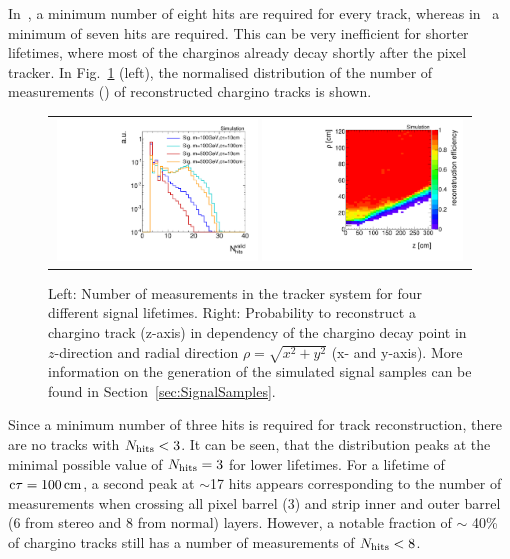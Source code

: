 In~\cite{bib:CMS:HSCP_8TeV}, a minimum number of eight hits are required for every track, whereas in~\cite{bib:CMS:DT_8TeV} a minimum of seven hits are required.
This can be very inefficient for shorter lifetimes, where most of the charginos already decay shortly after the pixel tracker.
In Fig.~\ref{fig:NHits_2Signal_noSelection_normalized} (left), the normalised distribution of the number of measurements (\nhits) of reconstructed chargino tracks is shown. 
\begin{figure}[!b]
  \centering 
  \begin{tabular}{c}
  \includegraphics[width=0.49\textwidth]{figures/analysis_2/MotivationAndGeneralSearchStrategy/htrackNValid_log_chiTracksnoSelection.pdf}
  \includegraphics[width=0.49\textwidth]{figures/analysis_2/MotivationAndGeneralSearchStrategy/RecoEffTracksZoom.pdf}
  \end{tabular}
  \caption{Left: Number of measurements in the tracker system \nhits for four different signal lifetimes.
           Right: Probability to reconstruct a chargino track (z-axis) in dependency of the chargino decay point in $z$-direction and radial direction $\rho = \sqrt{x^2 + y^2}$ (x- and y-axis).
           More information on the generation of the simulated signal samples can be found in Section~\ref{sec:SignalSamples}.} 
  \label{fig:NHits_2Signal_noSelection_normalized}
\end{figure}
Since a minimum number of three hits is required for track reconstruction, there are no tracks with $N_{\text{hits}}<3$.
It can be seen, that the distribution peaks at the minimal possible value of $N_{\text{hits}}=3$ for lower lifetimes.
For a lifetime of $\text{c}\tau=100\,\text{cm}$, a second peak at $\sim$17 hits appears corresponding to the number of measurements when crossing all pixel barrel (3) and strip inner and outer barrel (6 from stereo and 8 from normal) layers.
However, a notable fraction of $\sim$ 40\% of chargino tracks still has a number of measurements of $N_{\text{hits}}<8$. 

